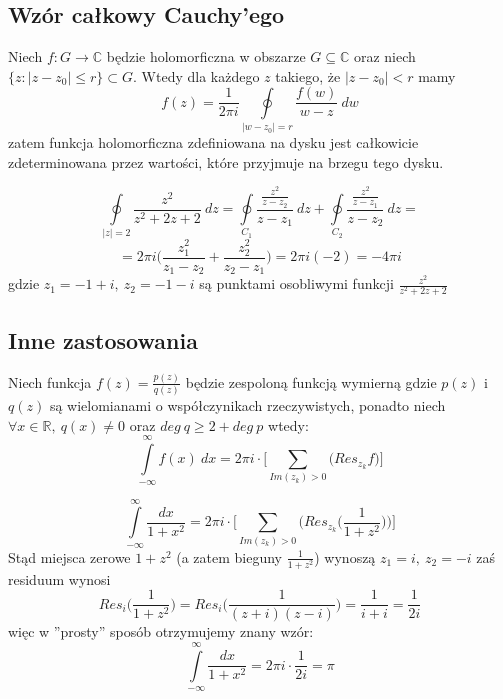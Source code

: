 \subsection{Wzór całkowy Cauchy'ego}

\begin{tw}
Niech $f:G\rightarrow\mathbb{C}$ będzie holomorficzna w obszarze $G\subseteq \mathbb{C}$ oraz niech $\{z: |z-z_0|\leq r\}\subset G$. Wtedy dla każdego $z$ takiego, że $|z-z_0|<r$ mamy $$f(z)=\frac{1}{2\pi i}\oint\limits_{|w-z_0|=r}\frac{f(w)}{w-z}\ dw$$ zatem funkcja holomorficzna zdefiniowana na dysku jest całkowicie zdeterminowana przez wartości, które przyjmuje na brzegu tego dysku.
\end{tw}

\begin{przyk}
$$\oint\limits_{|z|=2}\frac{z^2}{z^2+2z+2}\ dz=\oint\limits_{C_1}\frac{\frac{z^2}{z-z_2}}{z-z_1}\ dz+\oint\limits_{C_2}\frac{\frac{z^2}{z-z_1}}{z-z_2}\ dz=$$ $$=2\pi i \bigg(\frac{z_{1}^2}{z_1-z_2}+\frac{z_{2}^2}{z_2-z_1}\bigg)=2\pi i (-2)=-4\pi i$$
gdzie $z_1=-1+i,\ z_2=-1-i$ są punktami osobliwymi funkcji $\frac{z^2}{z^2+2z+2}$
\end{przyk}

\subsection{Inne zastosowania}

\begin{tw}
Niech funkcja $f(z)=\frac{p(z)}{q(z)}$ będzie zespoloną funkcją wymierną gdzie $p(z)$ i $q(z)$ są wielomianami o współczynikach rzeczywistych, ponadto niech $\forall x\in \mathbb{R},\ q(x)\neq 0$ oraz $deg\ q\geq 2+deg\ p$ wtedy: $$\int\limits_{-\infty}^{\infty}f(x)\ dx=2\pi i\cdot\Bigg[\sum_{Im (z_k)>0}\bigg(Res_{z_k}f \bigg)\Bigg]$$
\end{tw}

\begin{przyk}
$$\int\limits_{-\infty}^{\infty}\frac{dx}{1+x^2}=2\pi i\cdot\Bigg[\sum_{Im (z_k)>0}\bigg(Res_{z_k}\bigg(\frac{1}{1+z^2}\bigg) \bigg)\Bigg]$$
Stąd miejsca zerowe $1+z^2$ (a zatem bieguny $\frac{1}{1+z^2}$) wynoszą $z_1=i,\ z_2=-i$ zaś residuum wynosi $$Res_{i}\bigg(\frac{1}{1+z^2}\bigg)=Res_{i}\bigg(\frac{1}{(z+i)(z-i)}\bigg)=\frac{1}{i+i}=\frac{1}{2i}$$ więc w ''prosty'' sposób otrzymujemy znany wzór: $$\int\limits_{-\infty}^{\infty}\frac{dx}{1+x^2}=2\pi i\cdot \frac{1}{2i}=\pi$$
\end{przyk}
